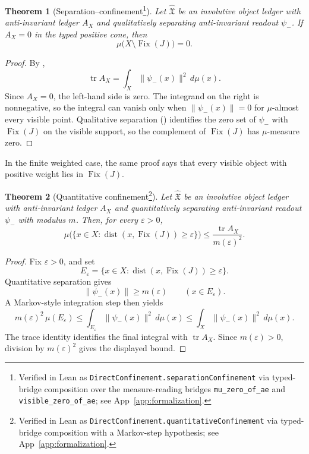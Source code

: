 \documentclass[11pt]{article}
\DeclareMathOperator{\Fix}{Fix}
\DeclareMathOperator{\dist}{dist}
\DeclareMathOperator{\trace}{tr}
\newcommand{\psim}{\psi_{-}}
\newcommand{\AX}{A_{X}}
\newcommand{\IOL}{\hat{\mathfrak{X}}}
\newtheorem{theorem}{Theorem}[section]
\theoremstyle{definition}
\begin{document}
\begin{theorem}[Separation--confinement\protect\footnote{Verified in Lean as \nolinkurl{DirectConfinement.separationConfinement} via typed-bridge composition over the measure-reading bridges \nolinkurl{mu_zero_of_ae} and \nolinkurl{visible_zero_of_ae}; see App~\ref{app:formalization}.}]
\label{thm:duality_confinement:separation-confinement}
Let \(\IOL\) be an involutive object ledger with anti-invariant
ledger \(\AX\) and qualitatively separating anti-invariant readout
\(\psim\).  If \(\AX=0\) in the typed positive cone, then
\[
  \mu\bigl(X\setminus\Fix(J)\bigr)=0.
\]
\end{theorem}

\begin{proof}
By ,
\[
  \trace\AX=\int_X\|\psim(x)\|^2\,d\mu(x).
\]
Since \(\AX=0\), the left-hand side is zero.  The integrand on the
right is nonnegative, so the integral can vanish only when
\(\|\psim(x)\|=0\) for \(\mu\)-almost every visible point.
Qualitative separation
() identifies the
zero set of \(\psim\) with \(\Fix(J)\) on the visible support, so
the complement of \(\Fix(J)\) has \(\mu\)-measure zero.
\end{proof}

In the finite weighted case, the same proof says that every visible
object with positive weight lies in \(\Fix(J)\).

\begin{theorem}[Quantitative confinement\protect\footnote{Verified in Lean as \nolinkurl{DirectConfinement.quantitativeConfinement} via typed-bridge composition with a Markov-step hypothesis; see App~\ref{app:formalization}.}]
\label{thm:duality_confinement:quantitative-confinement}
Let \(\IOL\) be an involutive object ledger with anti-invariant
ledger \(\AX\) and quantitatively separating anti-invariant readout
\(\psim\) with modulus \(m\).  Then, for every
\(\varepsilon>0\),
\[
  \mu\bigl(\{x\in X:\dist(x,\Fix(J))\geq\varepsilon\}\bigr)
  \leq
  \frac{\trace\AX}{m(\varepsilon)^2}.
\]
\end{theorem}

\begin{proof}
Fix \(\varepsilon>0\), and set
\[
  E_\varepsilon=\{x\in X:\dist(x,\Fix(J))\geq\varepsilon\}.
\]
Quantitative separation gives
\[
  \|\psim(x)\|\geq m(\varepsilon)
  \qquad (x\in E_\varepsilon).
\]
A Markov-style integration step \citep{Folland1999} then yields
\[
  m(\varepsilon)^2\,\mu(E_\varepsilon)
  \leq
  \int_{E_\varepsilon}\|\psim(x)\|^2\,d\mu(x)
  \leq
  \int_X\|\psim(x)\|^2\,d\mu(x).
\]
The trace identity identifies the final integral with
\(\trace\AX\).  Since \(m(\varepsilon)>0\), division by
\(m(\varepsilon)^2\) gives the displayed bound.
\end{proof}
\end{document}
